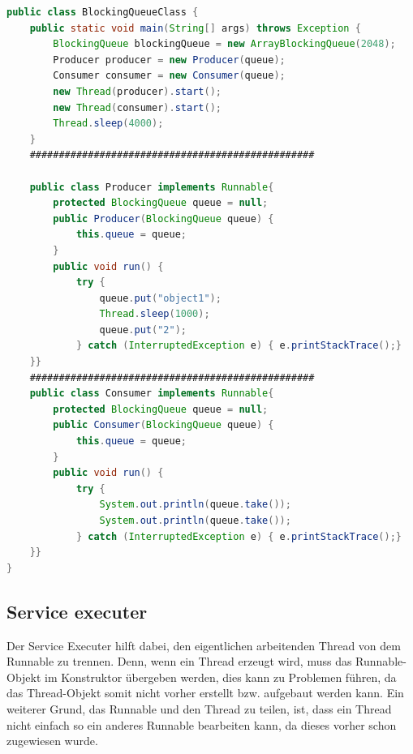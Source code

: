 \begin{lstlisting}[language=java,caption=Java BlockingQueue Beispiel,label=lst:impl:blockingQueue]
    public class BlockingQueueClass {
    public static void main(String[] args) throws Exception {
        BlockingQueue blockingQueue = new ArrayBlockingQueue(2048);
        Producer producer = new Producer(queue);
        Consumer consumer = new Consumer(queue);
        new Thread(producer).start();
        new Thread(consumer).start();
        Thread.sleep(4000);
    }
    #################################################
 
    public class Producer implements Runnable{
        protected BlockingQueue queue = null;
        public Producer(BlockingQueue queue) {
            this.queue = queue;
        }
        public void run() {
            try {
                queue.put("object1");
                Thread.sleep(1000);
                queue.put("2");
            } catch (InterruptedException e) { e.printStackTrace();}
    }}
    #################################################
    public class Consumer implements Runnable{
        protected BlockingQueue queue = null;
        public Consumer(BlockingQueue queue) {
            this.queue = queue;
        }
        public void run() {
            try {
                System.out.println(queue.take());
                System.out.println(queue.take());
            } catch (InterruptedException e) { e.printStackTrace();}
    }}
}
\end{lstlisting}
\cite{javaBlockingQueue}
 
\subsection{Service executer}
Der Service Executer hilft dabei, den eigentlichen arbeitenden Thread von dem Runnable zu trennen. Denn, wenn ein Thread erzeugt wird, muss das Runnable-Objekt im Konstruktor übergeben werden, dies kann zu Problemen führen, da das Thread-Objekt somit nicht vorher erstellt bzw. aufgebaut werden kann. Ein weiterer Grund, das Runnable und den Thread zu teilen, ist, dass ein Thread nicht einfach so ein anderes Runnable bearbeiten kann, da dieses vorher schon zugewiesen wurde.
\cite{javaInselBuch}
 
 
 
